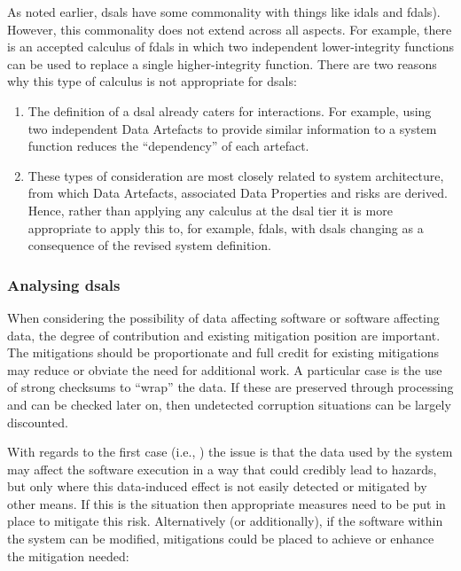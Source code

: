 As noted earlier, \glspl{dsal} have some commonality with things like \cbstart\glspl{idal} and \glspl{fdal})\cbend. However, this commonality does not extend across all aspects. For example, there is an accepted calculus of \glspl{fdal} in which two independent lower-integrity functions can be used to replace a single higher-integrity function. There are two reasons why this type of calculus is not appropriate for \glspl{dsal}:

\begin{enumerate}
  \item The definition of a \gls{dsal} already caters for interactions. For example, using two independent Data Artefacts to provide similar information to a system function reduces the ``dependency'' of each artefact.
  \item These types of consideration are most closely related to system architecture, from which Data Artefacts, associated Data Properties and risks are derived. Hence, rather than applying any calculus at the \gls{dsal} tier it is more appropriate to apply this to, for example, \glspl{fdal}, with \glspl{dsal} changing as a consequence of the revised system definition.
\end{enumerate}

\subsubsection{Analysing \glspl{dsal}}
When considering the possibility of data affecting software or software affecting data, the degree of contribution and existing mitigation position are important. The mitigations should be proportionate and full credit for existing mitigations may reduce or obviate the need for additional work. A particular case is the use of strong checksums to ``wrap'' the data. If these are preserved through processing and can be checked later on, then undetected  corruption situations can be largely discounted.

With regards to the first case (i.e., ) the issue is that the data used by the system may affect the software execution in a way that could credibly lead to hazards, but only where this data-induced effect is not easily detected or mitigated by other means. If this is the situation then appropriate measures need to be put in place  to mitigate this risk. Alternatively (or additionally), if the software within the system can be modified, mitigations could be placed  to achieve or enhance the mitigation needed:

